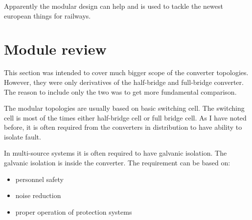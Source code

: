\documentclass[]{scrartcl}
\newenvironment{remark}[1][Remark]{\begin{trivlist}
		\item[\hskip \labelsep {\bfseries #1}]}{\end{trivlist}}
\begin{document}
Apparently the modular design can help and is used to tackle the newest european things for railways.

\section{Module  review}
\begin{remark}
	This section was intended to cover much bigger scope of the converter topologies. However, they were only derivatives of the half-bridge and full-bridge converter. The reason to include only the two was to get more fundamental comparison. 
\end{remark}

The modular topologies are usually based on basic switching cell. The switching cell is most of the times either half-bridge cell or full bridge cell. As I have noted before, it is often required from the converters in distribution to have ability to isolate fault. 

In multi-source systems it is often required to have galvanic isolation. The galvanic isolation is inside the converter. The requirement can be based on\cite{Karshenas2011}: 
\begin{itemize}
	\item personnel safety 
	\item noise reduction
	\item proper operation of protection systems
\end{itemize}
\end{document}

